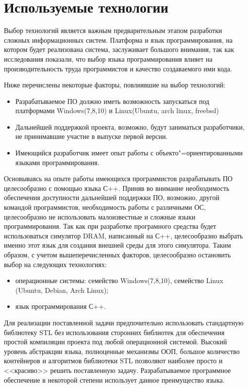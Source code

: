 \lstset{style=fsharpstyle}

\section{Используемые технологии}
\label{sec:practice:technology_used}

Выбор технологий является важным предварительным этапом разработки сложных информационных систем.
Платформа и язык программирования, на котором будет реализована система, заслуживает большого внимания, так как исследования показали, что выбор языка программирования влияет на производительность труда программистов и качество создаваемого ими кода.

Ниже перечислены некоторые факторы, повлиявшие на выбор технологий:
\begin{itemize}
\item Разрабатываемое ПО должно иметь возможность запускаться под платформами Windows(7,8,10) и Linux(Ubuntu, arch linux, freebsd)
\item Дальнейшей поддержкой проекта, возможно, будут заниматься разработчики, не принимавшие участие в выпуске первой версии.
\item Имеющийся разработчик имеет опыт работы с объекто"=ориентированными языками программирования.
\end{itemize}

Основываясь на опыте работы имеющихся программистов разрабатывать ПО целесообразно с помощью языка С++.
Приняв во внимание необходимость обеспечения доступности дальнейшей поддержки ПО, возможно, другой командой программистов, необходимость работы с различными ОС, целесообразно не использовать малоизвестные и сложные языки программирования.
Так как при разработке програмного средства будет использоваться симулятор DRAM, написанный на С++, целесообразно выбрать именно этот язык для создания внешней среды для этого симулятора.
Таким образом, с учетом вышеперечисленных факторов, целесообразно остановить выбор на следующих технологиях:
\begin{itemize}
  \item операционные системы: семейство Windows(7,8,10), семейство Linux\\(Ubuntu, Debian, Arch Linux);
  \item язык программирования С++.
\end{itemize}
Для реализации поставленной задачи предпочительно использовать стандартную библиотеку STL без использования сторонних библиотек для обеспечения простой компиляции проекта под любой операционной системой.
Высокий уровень абстракции языка, полноценные механизмы ООП, большое количество контейнеров и алгоритмов библиотеки STL позволяют наиболее просто и <<красиво>> решить поставленную задачу.
Разрабатываемое программное обеспечение в некоторой степени использует данное преимущество языка.

